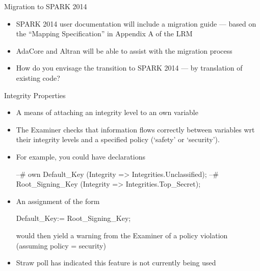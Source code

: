 \documentclass{beamer}
\begin{document}
\begin{frame}{Migration to SPARK 2014}

  \begin{itemize}

  \item SPARK 2014 user documentation will include a migration guide --- based on the ``Mapping Specification'' in Appendix A of the LRM
  \item AdaCore and Altran will be able to assist with the migration process
  \item How do you envisage the transition to SPARK 2014 --- by translation of existing code?

  \end{itemize}

\end{frame}

\begin{frame}[fragile]{Integrity Properties}

  \begin{itemize}

  \item A means of attaching an integrity level to an own variable
  \item The Examiner checks that information flows correctly between variables wrt their integrity levels and a specified policy (`safety' or `security').
  \item For example, you could have declarations

  \begin{pxcode}[language=SPARK,style=tinystyle,gobble=4]
    --# own Default_Key      (Integrity => Integrities.Unclassified);
    --#     Root_Signing_Key (Integrity => Integrities.Top_Secret);
  \end{pxcode}

  \item An assignment of the form 

  \begin{pxcode}[language=SPARK,style=tinystyle,gobble=4]
    Default_Key:= Root_Signing_Key;
  \end{pxcode}

  would then yield a warning from the Examiner of a policy violation (assuming policy = security)

  \item Straw poll has indicated this feature is not currently being used

  \end{itemize}

\end{frame}
\end{document}
